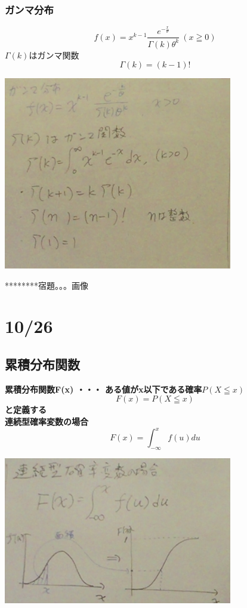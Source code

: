\documentclass{jsarticle}
\begin{document}
	\subsubsection{ガンマ分布}
	\[
		f(x)=x^{k-1}\frac{e^{-\frac{x}{θ}}}{Γ(k)θ^k} \ (x≧0)
	\]
	$Γ(k)$はガンマ関数
	\[
		Γ(k)=(k-1)!
	\]
		\begin{center}
			\includegraphics[width=10cm]{10_19_5.JPG}
		\end{center}
		********宿題。。。画像
\section{10/26}

	\subsection{累積分布関数}
	\bf{累積分布関数F(x)} ・・・ ある値がx以下である確率$P(X ≦ x)$
	\[
		F(x)=P(X ≦ x)
	\]
	と定義する \\
	連続型確率変数の場合 \\
	\[
		F(x)=\int^x_{-∞} f(u) du
	\]
	\begin{center}
		\includegraphics[width=10cm]{10_26_1.JPG}
	\end{center}
		
\end{document}
